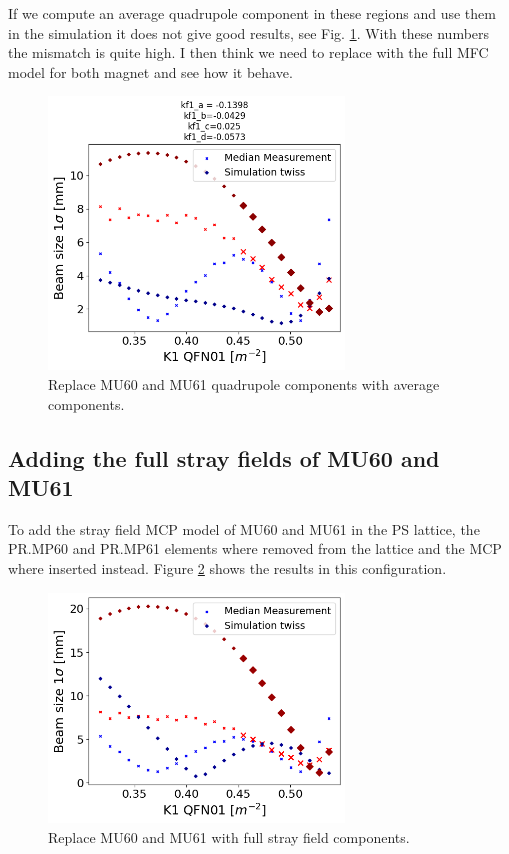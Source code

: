 If we compute an average quadrupole component in these regions and use them in the simulation it does not give good results, see Fig. \ref{fig:replace_with_average}. With these numbers the mismatch is quite high. I then think we need to replace with the full MFC model for both magnet and see how it behave.

\begin{figure}[H]
\centering
\includegraphics[width=0.7\textwidth]{02_Simulation/images/Replace MU60 and MU61 with stray field-2.png}
\caption{Replace MU60 and MU61 quadrupole components with average components.}
\label{fig:replace_with_average}
\end{figure}

\subsection{Adding the full stray fields of MU60 and MU61}

To add the stray field MCP model of MU60 and MU61 in the PS lattice, the PR.MP60 and PR.MP61 elements where removed from the lattice and the MCP where inserted instead. Figure \ref{fig:mcp_mu60_mu61} shows the results in this configuration.

\begin{figure}[H]
\centering
\includegraphics[width=0.7\textwidth]{02_Simulation/images/mcp_mu60_mu61.png}
\caption{Replace MU60 and MU61 with full stray field components.}
\label{fig:mcp_mu60_mu61}
\end{figure}


